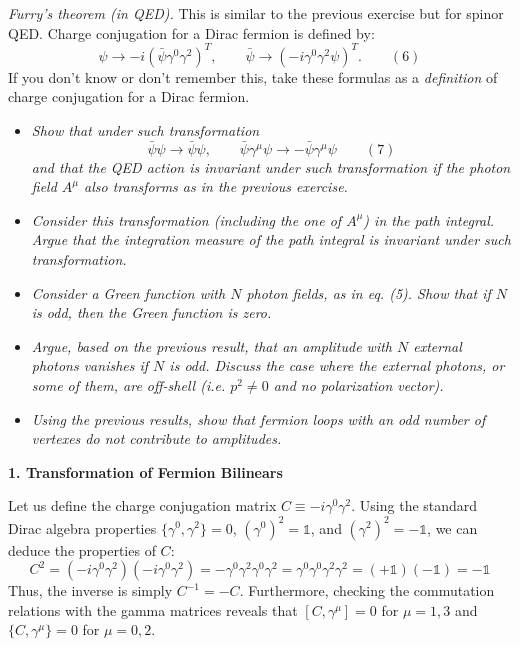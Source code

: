\begin{center}
    \textit{Furry's theorem (in QED).} This is similar to the previous exercise but for spinor QED. Charge conjugation for a Dirac fermion is defined by:
    \[
        \psi \to -i(\bar{\psi}\gamma^0\gamma^2)^T, \qquad \bar{\psi} \to (-i\gamma^0\gamma^2\psi)^T. \qquad (6)
    \]
    If you don't know or don't remember this, take these formulas as a \textit{definition} of charge conjugation for a Dirac fermion.
    \begin{itemize}
        \item \textit{Show that under such transformation}
              \[
                  \bar{\psi}\psi \to \bar{\psi}\psi, \qquad \bar{\psi}\gamma^\mu\psi \to -\bar{\psi}\gamma^\mu\psi \qquad (7)
              \]
              \textit{and that the QED action is invariant under such transformation if the photon field $A^\mu$ also transforms as in the previous exercise.}
        \item \textit{Consider this transformation (including the one of $A^\mu$) in the path integral. Argue that the integration measure of the path integral is invariant under such transformation.}
        \item \textit{Consider a Green function with $N$ photon fields, as in eq. (5). Show that if $N$ is odd, then the Green function is zero.}
        \item \textit{Argue, based on the previous result, that an amplitude with $N$ external photons vanishes if $N$ is odd. Discuss the case where the external photons, or some of them, are off-shell (i.e. $p^2 \neq 0$ and no polarization vector).}
        \item \textit{Using the previous results, show that fermion loops with an odd number of vertexes do not contribute to amplitudes.}
    \end{itemize}
\end{center}

\textbf{1. Transformation of Fermion Bilinears}

Let us define the charge conjugation matrix $C \equiv -i\gamma^0\gamma^2$. Using the standard Dirac algebra properties $\{\gamma^0, \gamma^2\} = 0$, $(\gamma^0)^2 = \mathbb{1}$, and $(\gamma^2)^2 = -\mathbb{1}$, we can deduce the properties of $C$:
\[
    C^2 = (-i\gamma^0\gamma^2)(-i\gamma^0\gamma^2) = -\gamma^0\gamma^2\gamma^0\gamma^2 = \gamma^0\gamma^0\gamma^2\gamma^2 = (+\mathbb{1})(-\mathbb{1}) = -\mathbb{1}
\]
Thus, the inverse is simply $C^{-1} = -C$. Furthermore, checking the commutation relations with the gamma matrices reveals that $[C, \gamma^\mu] = 0$ for $\mu = 1, 3$ and $\{C, \gamma^\mu\} = 0$ for $\mu = 0, 2$.

